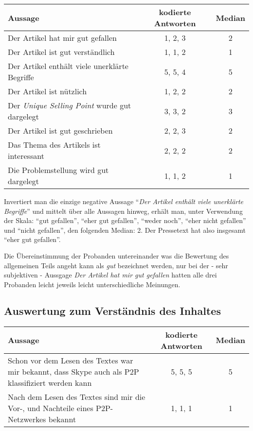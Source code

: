 \begin{table}[!ht]
    \begin{center}
        \begin{tabular}{lcc}
        \toprule
        \textbf{Aussage} & \textbf{kodierte Antworten} & \textbf{Median} \\
        \midrule
        Der Artikel hat mir gut gefallen & 1, 2, 3 & 2 \\
        Der Artikel ist gut verständlich & 1, 1, 2 & 1 \\
        Der Artikel enthält viele unerklärte Begriffe & 5, 5, 4 & 5 \\
        Der Artikel ist nützlich & 1, 2, 2 & 2 \\
        Der \emph{Unique Selling Point} wurde gut dargelegt & 3, 3, 2 & 3 \\
        Der Artikel ist gut geschrieben & 2, 2, 3 & 2 \\
        Das Thema des Artikels ist interessant & 2, 2, 2 & 2 \\
        Die Problemstellung wird gut dargelegt & 1, 1, 2 & 1 \\
        \bottomrule
        \end{tabular}
    \end{center}
\end{table}

Invertiert man die einzige negative Aussage \enquote{\emph{Der Artikel enthält
viele unerklärte Begriffe}} und mittelt über alle Aussagen hinweg, erhält man,
unter Verwendung der Skala: \enquote{gut gefallen}, \enquote{eher gut
gefallen}, \enquote{weder noch}, \enquote{eher nicht gefallen} und
\enquote{nicht gefallen}, den folgenden Median: 2.
Der Pressetext hat also insgesamt \enquote{eher gut gefallen}.

Die Übereinstimmung der Probanden untereinander was die Bewertung des
allgemeinen Teils angeht kann als \emph{gut} bezeichnet werden, nur bei 
der - sehr subjektiven - Aussgage {\emph{Der Artikel hat mir gut gefallen}} hatten 
alle drei Probanden leicht jeweils leicht unterschiedliche Meinungen.


\subsection{Auswertung zum Verständnis des Inhaltes}

\begin{table}[!ht]
    \begin{center}
        \begin{tabular}{p{8cm}cc}
        \toprule
        \textbf{Aussage} & \textbf{kodierte Antworten} & \textbf{Median} \\
        \midrule
        Schon vor dem Lesen des Textes war mir bekannt, dass Skype auch als P2P klassifiziert werden kann& 5, 5, 5 & 5 \\
        \addlinespace
       Nach dem Lesen des Textes sind mir die Vor-, und Nachteile eines P2P-Netzwerkes bekannt & 1, 1, 1 & 1 \\
        \bottomrule
        \end{tabular}
    \end{center}
\end{table}

